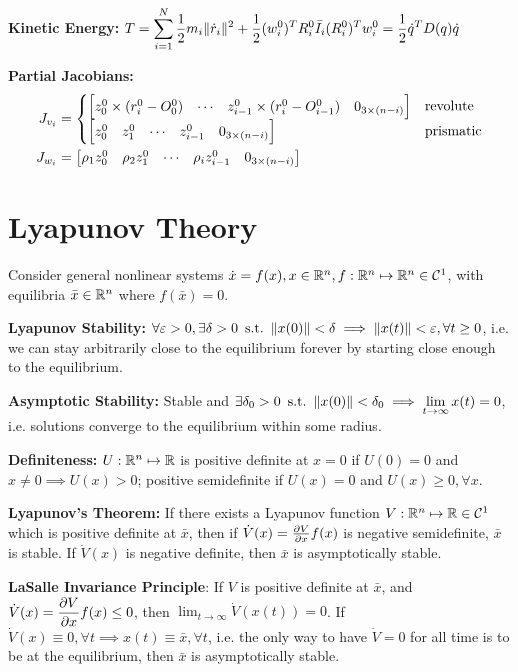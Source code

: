 \documentclass[twocolumn, 8pt]{extarticle}
\begin{document}
\textbf{Kinetic Energy:} \(\displaystyle T = \sum _{i = 1}^N \frac{1}{2}m_i\lVert\dot r_i\rVert^2 + \frac{1}{2}(w_i^0)^TR_i^0\bar I_i(R_i^0)^Tw_i^0 = \frac{1}{2}\dot q^TD(q)\dot q\)

\textbf{Partial Jacobians:}
\begin{align*}
J_{v_i} &= \twocond{\rvec{z_0^0 \times (r_i^0 - O_0^0)}{\cdots}{z_{i - 1}^0 \times (r_i^0 - O_{i - 1}^0)}{0_{3 \times (n - i)}}}{\text{revolute}}{\rvec{z_0^0}{z_1^0}{\cdots}{z_{i - 1}^0}{0_{3 \times (n - i)}}}{\text{prismatic}} \\
J_{w_i} &= \rvec{\rho _1z_0^0}{\rho _2z_1^0}{\cdots}{\rho _iz_{i - 1}^0}{0_{3 \times (n - i)}}
\end{align*}

\section{Lyapunov Theory}

Consider general nonlinear systems \(\dot x = f(x), x \in \mathbb{R}^n, f: \mathbb{R}^n \mapsto \mathbb{R}^n \in \mathcal C^1\), with
equilibria \(\bar x \in \mathbb{R}^n\) where \(f(\bar x) = 0\).

\textbf{Lyapunov Stability:} \(\forall \varepsilon > 0, \exists \delta > 0 \enspace\mathrm{s.t.}\enspace \lVert x(0)\rVert < \delta \implies
\lVert x(t)\rVert < \varepsilon, \forall t \geq 0\), i.e. we can stay arbitrarily close to the equilibrium forever by starting close
enough to the equilibrium.

\textbf{Asymptotic Stability:} Stable and \(\displaystyle\exists \delta _0 > 0 \enspace\mathrm{s.t.}\enspace \lVert x(0)\rVert < \delta _0 \implies \lim _{t \to \infty} x(t) = 0\),
i.e. solutions converge to the equilibrium within some radius.

\textbf{Definiteness:} \(U: \mathbb{R}^n \mapsto \mathbb{R}\) is positive definite at \(x = 0\) if \(U(0) = 0\) and \(x \neq 0
\implies U(x) > 0\); positive semidefinite if \(U(x) = 0\) and \(U(x) \geq 0, \forall x\).

\textbf{Lyapunov's Theorem:} If there exists a Lyapunov function \(V: \mathbb{R}^n \mapsto \mathbb{R} \in \mathcal C^1\) which
is positive definite at \(\bar x\), then if $\dot V(x) = \frac{\partial V}{\partial x}f(x)$ is negative semidefinite,
\(\bar x\) is stable. If $\dot V(x)$ is negative definite, then \(\bar x\) is asymptotically stable.

\textbf{LaSalle Invariance Principle}: If \(V\) is positive definite at \(\bar x\), and \(\displaystyle \dot V(x) =
\frac{\partial V}{\partial x}f(x) \leq 0\), then \(\displaystyle \lim _{t \to \infty} \dot V(x(t)) = 0\). If $\dot V(x) \equiv 0, \forall
t \implies x(t) \equiv \bar x, \forall t$, i.e. the only way to have \(\dot V = 0\) for all time is to be at the
equilibrium, then \(\bar x\) is asymptotically stable.
\end{document}
